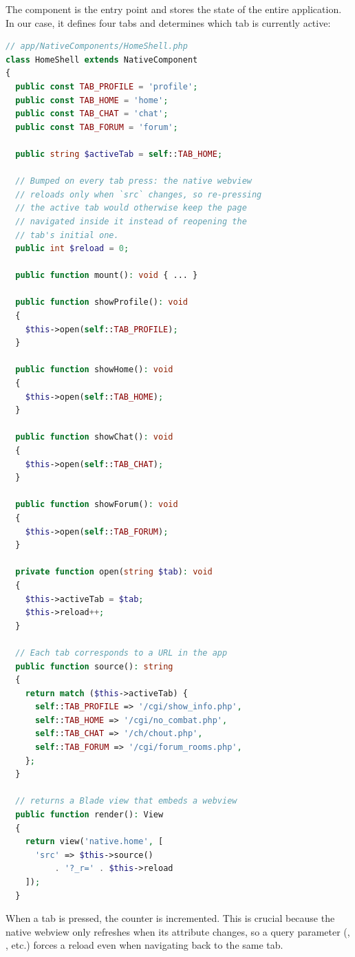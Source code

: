 The  component is the entry point and stores the state of the entire application.
In our case, it defines four tabs and determines which tab is currently active:

\begin{lstlisting}[language=php]
// app/NativeComponents/HomeShell.php
class HomeShell extends NativeComponent
{
  public const TAB_PROFILE = 'profile';
  public const TAB_HOME = 'home';
  public const TAB_CHAT = 'chat';
  public const TAB_FORUM = 'forum';

  public string $activeTab = self::TAB_HOME;

  // Bumped on every tab press: the native webview
  // reloads only when `src` changes, so re-pressing
  // the active tab would otherwise keep the page
  // navigated inside it instead of reopening the
  // tab's initial one.
  public int $reload = 0;

  public function mount(): void { ... }

  public function showProfile(): void
  {
    $this->open(self::TAB_PROFILE);
  }

  public function showHome(): void
  {
    $this->open(self::TAB_HOME);
  }

  public function showChat(): void
  {
    $this->open(self::TAB_CHAT);
  }

  public function showForum(): void
  {
    $this->open(self::TAB_FORUM);
  }

  private function open(string $tab): void
  {
    $this->activeTab = $tab;
    $this->reload++;
  }

  // Each tab corresponds to a URL in the app
  public function source(): string
  {
    return match ($this->activeTab) {
      self::TAB_PROFILE => '/cgi/show_info.php',
      self::TAB_HOME => '/cgi/no_combat.php',
      self::TAB_CHAT => '/ch/chout.php',
      self::TAB_FORUM => '/cgi/forum_rooms.php',
    };
  }

  // returns a Blade view that embeds a webview
  public function render(): View
  {
    return view('native.home', [
      'src' => $this->source()
          . '?_r=' . $this->reload
    ]);
  }
\end{lstlisting}

\noindent When a tab is pressed, the  counter is incremented. This is crucial because
the native webview only refreshes when its  attribute changes, so a query parameter
(, , etc.) forces a reload even when navigating back to the same tab.

